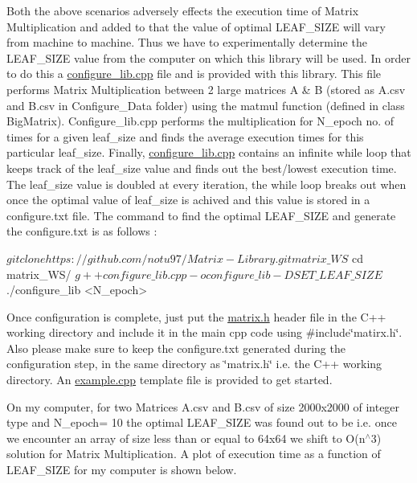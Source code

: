 Both the above scenarios adversely effects the execution time of Matrix Multiplication and added to that the value of optimal {\ttfamily L\+E\+A\+F\+\_\+\+S\+I\+ZE} will vary from machine to machine. Thus we have to experimentally determine the {\ttfamily L\+E\+A\+F\+\_\+\+S\+I\+ZE} value from the computer on which this library will be used. In order to do this a {\ttfamily \hyperlink{configure__lib_8cpp}{configure\+\_\+lib.\+cpp}} file and is provided with this library. This file performs Matrix Multiplication between 2 large matrices A \& B (stored as A.\+csv and B.\+csv in Configure\+\_\+\+Data folder) using the {\ttfamily matmul} function (defined in class {\ttfamily Big\+Matrix}). {\ttfamily Configure\+\_\+lib.\+cpp} performs the multiplication for {\ttfamily N\+\_\+epoch} no. of times for a given {\ttfamily leaf\+\_\+size} and finds the average execution times for this particular {\ttfamily leaf\+\_\+size}. Finally, {\ttfamily \hyperlink{configure__lib_8cpp}{configure\+\_\+lib.\+cpp}} contains an infinite while loop that keeps track of the {\ttfamily leaf\+\_\+size} value and finds out the best/lowest execution time. The {\ttfamily leaf\+\_\+size} value is doubled at every iteration, the while loop breaks out when once the optimal value of {\ttfamily leaf\+\_\+size} is achived and this value is stored in a {\ttfamily configure.\+txt} file. The command to find the optimal {\ttfamily L\+E\+A\+F\+\_\+\+S\+I\+ZE} and generate the {\ttfamily configure.\+txt} is as follows \+:


\begin{DoxyCode}
$ git clone https://github.com/notu97/Matrix-Library.git matrix\_WS
$ cd matrix\_WS/
$ g++ configure\_lib.cpp -o configure\_lib -DSET\_LEAF\_SIZE
$ ./configure\_lib <N\_epoch>
\end{DoxyCode}


Once configuration is complete, just put the {\ttfamily \hyperlink{matrix_8h}{matrix.\+h}} header file in the C++ working directory and include it in the main cpp code using {\ttfamily \#include\char`\"{}matirx.\+h\char`\"{}}. Also please make sure to keep the {\ttfamily configure.\+txt} generated during the configuration step, in the same directory as \char`\"{}matrix.\+h\char`\"{} i.\+e. the C++ working directory. An {\ttfamily \hyperlink{example_8cpp}{example.\+cpp}} template file is provided to get started.

On my computer, for two Matrices A.\+csv and B.\+csv of size 2000x2000 of integer type and {\ttfamily N\+\_\+epoch}= 10 the optimal {\ttfamily L\+E\+A\+F\+\_\+\+S\+I\+ZE} was found out to be {} i.\+e. once we encounter an array of size less than or equal to 64x64 we shift to {\ttfamily O(n$^\wedge$3)} solution for Matrix Multiplication. A plot of execution time as a function of {\ttfamily L\+E\+A\+F\+\_\+\+S\+I\+ZE} for my computer is shown below.



